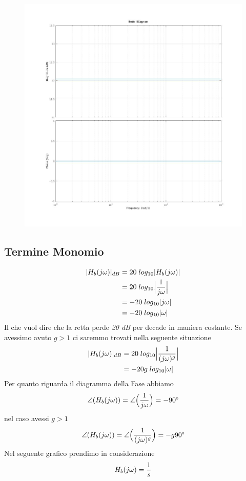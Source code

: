 \documentclass{article}
\begin{document}
			\begin{figure}[h!]
				\centering
				\includegraphics[scale=0.4]{./pictures/termine_guadagno.jpg}
			\end{figure}

		\newpage
		\subsection{Termine Monomio}
			\[
				\begin{aligned}
					\vert H_b(j\omega) \vert_{dB} &= 20\; log_{10}\vert H_b(j\omega) \vert \\
					&= 20\; log_{10}\Big\vert {1\over{j\omega}} \Big\vert \\
					&= -20\; log_{10}\vert j\omega \vert \\
					&= -20\; log_{10}\vert \omega \vert
				\end{aligned}
			\]
			Il che vuol dire che la retta perde \textit{20 dB} per decade in maniera costante. Se avessimo avuto $ g>1 $ ci saremmo trovati nella seguente situazione
			\[
				\begin{aligned}
					\vert H_b(j\omega) \vert_{dB} &= 20\; log_{10}\Big\vert {1\over{(j\omega)^g}} \Big\vert \\
					&= -20g\; log_{10}\vert \omega \vert
				\end{aligned}
			\]
			Per quanto riguarda il diagramma della Fase abbiamo
			\[
				\angle(H_b(j\omega)) = \angle\Big( {1\over{j\omega}} \Big) = -90\degree
			\]
			nel caso avessi $ g>1 $
			\[
				\angle(H_b(j\omega)) = \angle\Big( {1\over{(j\omega)^g}} \Big) = -g90\degree
			\]
			Nel seguente grafico prendimo in considerazione
			\[
				H_b(j\omega) = {1\over{s}}
			\]
\end{document}
